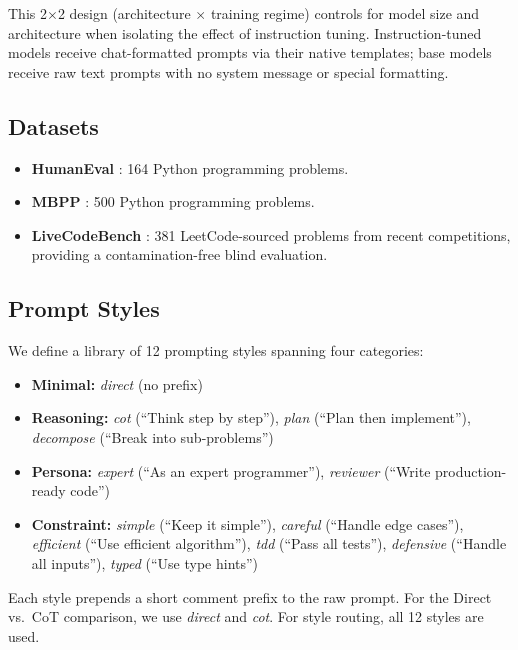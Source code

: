 \documentclass[11pt]{article}
\begin{document}
This 2$\times$2 design (architecture $\times$ training regime) controls for model size and architecture when isolating the effect of instruction tuning. Instruction-tuned models receive chat-formatted prompts via their native templates; base models receive raw text prompts with no system message or special formatting.

\subsection{Datasets}

\begin{itemize}
    \item \textbf{HumanEval} \citep{chen2021evaluating}: 164 Python programming problems.
    \item \textbf{MBPP} \citep{austin2021mbpp}: 500 Python programming problems.
    \item \textbf{LiveCodeBench} \citep{jain2024livecodebench}: 381 LeetCode-sourced problems from recent competitions, providing a contamination-free blind evaluation.
\end{itemize}

\subsection{Prompt Styles}

We define a library of 12 prompting styles spanning four categories:

\begin{itemize}
    \item \textbf{Minimal:} \emph{direct} (no prefix)
    \item \textbf{Reasoning:} \emph{cot} (``Think step by step''), \emph{plan} (``Plan then implement''), \emph{decompose} (``Break into sub-problems'')
    \item \textbf{Persona:} \emph{expert} (``As an expert programmer''), \emph{reviewer} (``Write production-ready code'')
    \item \textbf{Constraint:} \emph{simple} (``Keep it simple''), \emph{careful} (``Handle edge cases''), \emph{efficient} (``Use efficient algorithm''), \emph{tdd} (``Pass all tests''), \emph{defensive} (``Handle all inputs''), \emph{typed} (``Use type hints'')
\end{itemize}

Each style prepends a short comment prefix to the raw prompt. For the Direct vs.\ CoT comparison, we use \emph{direct} and \emph{cot}. For style routing, all 12 styles are used.
\end{document}
